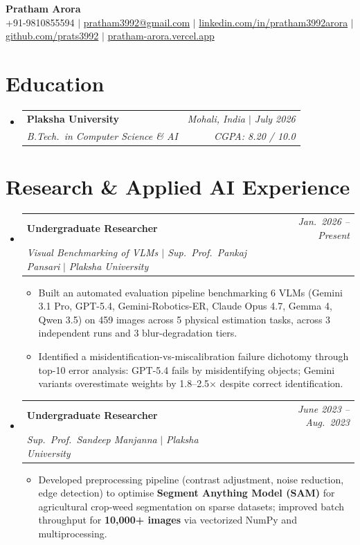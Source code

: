 \documentclass[a4paper,10pt]{article}
\makeatletter
\newcommand{\resumeSubHeadingListStart}{\begin{itemize}[leftmargin=0.15in, label={}]}
\newcommand{\resumeSubHeadingListEnd}{\end{itemize}}
\newcommand{\resumeItemListStart}{\begin{itemize}[leftmargin=0.2in]}
\newcommand{\resumeItemListEnd}{\end{itemize}\vspace{1pt}}
\newcommand{\resumeItem}[1]{\item\small{#1 \vspace{-2pt}}}
\newcommand{\resumeSubheading}[4]{
  \vspace{-2pt}\item
    \begin{tabular*}{0.97\textwidth}[t]{l@{\extracolsep{\fill}}r}
      \textbf{#1} & \textit{\small #2} \\
      \textit{\small#3} & \textit{\small #4} \\[0pt]
    \end{tabular*}
}
\newcommand{\resumeExperienceHeading}[4]{
  \vspace{1pt}\item
    \begin{tabular*}{0.97\textwidth}[t]{l@{\extracolsep{\fill}}r}
      \textbf{\large #1} & \textit{\small #4} \\
      \textit{\small #2} $|$ \textit{\small #3} & \\[1pt]
    \end{tabular*}
}
\makeatother
\begin{document}
\begin{center}
    \textbf{\Huge Pratham Arora} \\ \vspace{5pt}
    \small
    +91-9810855594 $|$
    \href{mailto:pratham3992@gmail.com}{pratham3992@gmail.com} $|$
    \href{https://www.linkedin.com/in/pratham3992arora}{linkedin.com/in/pratham3992arora} $|$
    \href{https://github.com/prats3992}{github.com/prats3992} $|$
    \href{https://pratham-arora.vercel.app/}{pratham-arora.vercel.app}
\end{center}

\section{Education}
\resumeSubHeadingListStart
  \resumeSubheading
    {Plaksha University}{Mohali, India $|$ July 2026}
    {B.Tech.\ in Computer Science \& AI}{CGPA: 8.20 / 10.0}
\resumeSubHeadingListEnd


\section{Research \& Applied AI Experience}
\resumeSubHeadingListStart

  \resumeExperienceHeading
    {Undergraduate Researcher}{Visual Benchmarking of VLMs $|$ Sup.\ Prof.\ Pankaj Pansari}{Plaksha University}{Jan.\ 2026 -- Present}
    \resumeItemListStart
      \resumeItem{Built an automated evaluation pipeline benchmarking 6 VLMs (Gemini 3.1 Pro, GPT-5.4, Gemini-Robotics-ER, Claude Opus 4.7, Gemma 4, Qwen 3.5) on 459 images across 5 physical estimation tasks, across 3 independent runs and 3 blur-degradation tiers.}
      \resumeItem{Identified a misidentification-vs-miscalibration failure dichotomy through top-10 error analysis: GPT-5.4 fails by misidentifying objects; Gemini variants overestimate weights by 1.8--2.5$\times$ despite correct identification.}
    \resumeItemListEnd

  \resumeExperienceHeading
    {Undergraduate Researcher}{Sup.\ Prof.\ Sandeep Manjanna}{Plaksha University}{June 2023 -- Aug.\ 2023}
    \resumeItemListStart
      \resumeItem{Developed preprocessing pipeline (contrast adjustment, noise reduction, edge detection) to optimise \textbf{Segment Anything Model (SAM)} for agricultural crop-weed segmentation on sparse datasets; improved batch throughput for \textbf{10,000+ images} via vectorized NumPy and multiprocessing.}
    \resumeItemListEnd

\resumeSubHeadingListEnd
\end{document}
